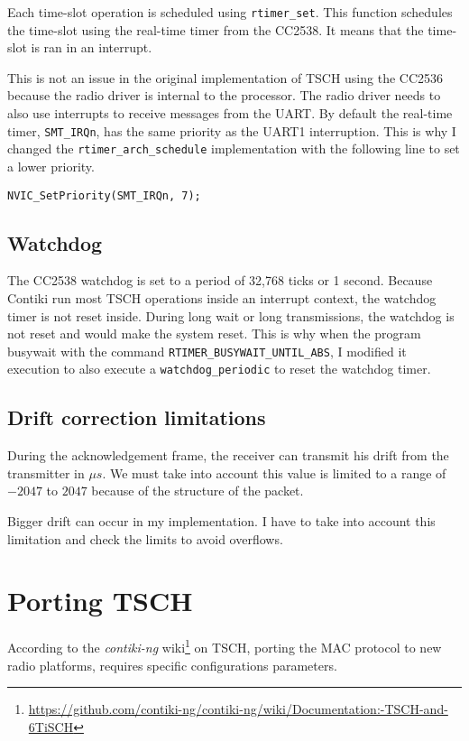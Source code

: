 Each time-slot operation is scheduled using \lstinline{rtimer_set}.
This function schedules the time-slot using the real-time timer from the CC2538.
It means that the time-slot is ran in an interrupt.

This is not an issue in the original implementation of TSCH using the CC2536
because the radio driver is internal to the processor.
The radio driver needs to also use interrupts to receive messages from the UART.
By default the real-time timer, \lstinline{SMT_IRQn}, has the same priority as
the UART1 interruption. 
This is why I changed the \lstinline{rtimer_arch_schedule} implementation with
the following line to set a lower priority.

\begin{lstlisting}
NVIC_SetPriority(SMT_IRQn, 7); 
\end{lstlisting}

\subsection{Watchdog}

The CC2538 watchdog is set to a period of 32,768 ticks or 1 second. 
Because Contiki run most TSCH operations inside an interrupt
context, the watchdog timer is not reset inside.
During long wait or long transmissions, the watchdog is not reset and would
make the system reset.
This is why when the program busywait with the command
\lstinline{RTIMER_BUSYWAIT_UNTIL_ABS}, I modified it execution to also execute
a \lstinline{watchdog_periodic} to reset the watchdog timer.

\subsection{Drift correction limitations}

During the acknowledgement frame, the receiver can transmit his drift from the
transmitter in $\mu s$. 
We must take into account this value is limited to a range of $-2047$ to
$2047$ because of the structure of the packet.

Bigger drift can occur in my implementation. 
I have to take into account this limitation and check the limits to avoid 
overflows.

\section{Porting TSCH}

According to the \emph{contiki-ng}
wiki\footnote{\url{https://github.com/contiki-ng/contiki-ng/wiki/Documentation:-TSCH-and-6TiSCH}}
on TSCH, porting the MAC protocol to new radio platforms, requires specific
configurations parameters.

